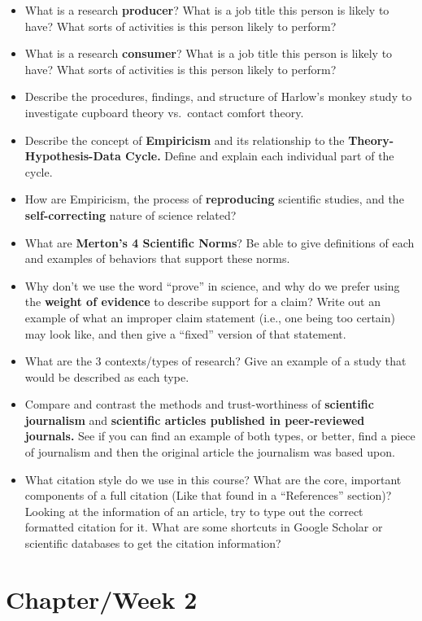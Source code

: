 \documentclass[
  12pt,
  letterpaper,
]{scrartcl}
\begin{document}
\begin{itemize}
\item
  What is a research \textbf{producer}? What is a job title this person
  is likely to have? What sorts of activities is this person likely to
  perform?
\item
  What is a research \textbf{consumer}? What is a job title this person
  is likely to have? What sorts of activities is this person likely to
  perform?
\item
  Describe the procedures, findings, and structure of Harlow's monkey
  study to investigate cupboard theory vs.~contact comfort theory.
\item
  Describe the concept of \textbf{Empiricism} and its relationship to
  the \textbf{Theory-Hypothesis-Data Cycle.} Define and explain each
  individual part of the cycle.
\item
  How are Empiricism, the process of \textbf{reproducing} scientific
  studies, and the \textbf{self-correcting} nature of science related?
\item
  What are \textbf{Merton's 4 Scientific Norms}? Be able to give
  definitions of each and examples of behaviors that support these
  norms.
\item
  Why don't we use the word ``prove'' in science, and why do we prefer
  using the \textbf{weight of evidence} to describe support for a claim?
  Write out an example of what an improper claim statement (i.e., one
  being too certain) may look like, and then give a ``fixed'' version of
  that statement.
\item
  What are the 3 contexts/types of research? Give an example of a study
  that would be described as each type.
\item
  Compare and contrast the methods and trust-worthiness of
  \textbf{scientific journalism} and \textbf{scientific articles
  published in peer-reviewed journals.} See if you can find an example
  of both types, or better, find a piece of journalism and then the
  original article the journalism was based upon.
\item
  What citation style do we use in this course? What are the core,
  important components of a full citation (Like that found in a
  ``References'' section)? Looking at the information of an article, try
  to type out the correct formatted citation for it. What are some
  shortcuts in Google Scholar or scientific databases to get the
  citation information?
\end{itemize}

\section{Chapter/Week 2}\label{sec-ch-2}
\end{document}
